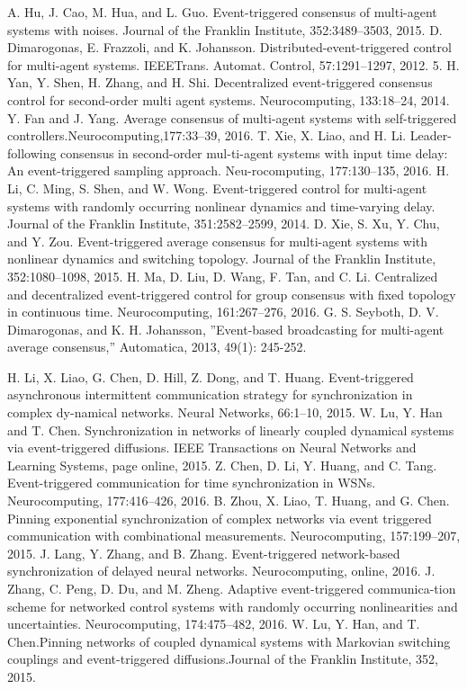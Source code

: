 \begin{thebibliography}{99}
 A. Hu, J. Cao, M. Hua, and L. Guo. Event-triggered consensus of multi-agent systems with noises. Journal of the Franklin Institute, 352:3489–3503, 2015.
 D. Dimarogonas, E. Frazzoli, and K. Johansson. Distributed-event-triggered control for multi-agent systems. IEEETrans. Automat. Control, 57:1291–1297, 2012. 5.
 H. Yan, Y. Shen, H. Zhang, and H. Shi. Decentralized event-triggered consensus control for second-order multi agent systems. Neurocomputing, 133:18–24, 2014.
 Y. Fan and J. Yang. Average consensus of multi-agent systems with self-triggered controllers.Neurocomputing,177:33–39, 2016.
 T. Xie, X. Liao, and H. Li. Leader-following consensus in second-order mul-ti-agent systems with input time delay: An event-triggered sampling approach. Neu-rocomputing, 177:130–135, 2016.
 H. Li, C. Ming, S. Shen, and W. Wong. Event-triggered control for multi-agent systems with randomly occurring nonlinear dynamics and time-varying delay. Journal of the Franklin Institute, 351:2582–2599, 2014.
 D. Xie, S. Xu, Y. Chu, and Y. Zou. Event-triggered average consensus for multi-agent systems with nonlinear dynamics and switching topology. Journal of the Franklin Institute, 352:1080–1098, 2015.
 H. Ma, D. Liu, D. Wang, F. Tan, and C. Li. Centralized and decentralized event-triggered control for group consensus with fixed topology in continuous time. Neurocomputing, 161:267–276, 2016.
 G. S. Seyboth, D. V. Dimarogonas, and K. H. Johansson, ”Event-based broadcasting for multi-agent average consensus,” Automatica, 2013, 49(1): 245-252.

 H. Li, X. Liao, G. Chen, D. Hill, Z. Dong, and T. Huang. Event-triggered asynchronous intermittent communication strategy for synchronization in complex dy-namical networks. Neural Networks, 66:1–10, 2015.
 W. Lu, Y. Han and T. Chen. Synchronization in networks of linearly coupled dynamical systems via event-triggered diffusions. IEEE Transactions on Neural Networks and Learning Systems, page online, 2015.
 Z. Chen, D. Li, Y. Huang, and C. Tang. Event-triggered communication for time synchronization in WSNs. Neurocomputing, 177:416–426, 2016.
 B. Zhou, X. Liao, T. Huang, and G. Chen. Pinning exponential synchronization of complex networks via event triggered communication with combinational measurements. Neurocomputing, 157:199–207, 2015.
 J. Lang, Y. Zhang, and B. Zhang. Event-triggered network-based synchronization of delayed neural networks. Neurocomputing, online, 2016.
 J. Zhang, C. Peng, D. Du, and M. Zheng. Adaptive event-triggered communica-tion scheme for networked control systems with randomly occurring nonlinearities and uncertainties. Neurocomputing, 174:475–482, 2016.
 W. Lu, Y. Han, and T. Chen.Pinning networks of coupled dynamical systems with Markovian switching couplings and event-triggered diffusions.Journal of the Franklin Institute, 352, 2015.


\end{thebibliography}
